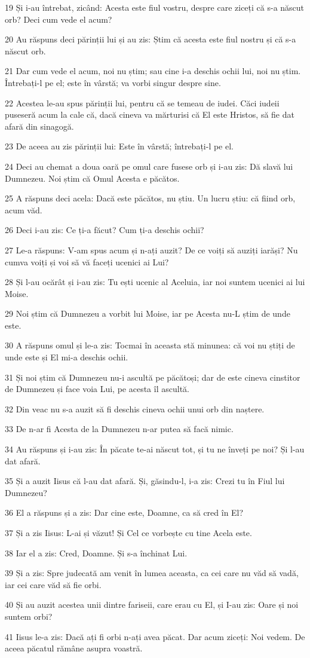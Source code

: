 \par 19 Și i-au întrebat, zicând: Acesta este fiul vostru, despre care ziceți că s-a născut orb? Deci cum vede el acum?
\par 20 Au răspuns deci părinții lui și au zis: Știm că acesta este fiul nostru și că s-a născut orb.
\par 21 Dar cum vede el acum, noi nu știm; sau cine i-a deschis ochii lui, noi nu știm. Întrebați-l pe el; este în vârstă; va vorbi singur despre sine.
\par 22 Acestea le-au spus părinții lui, pentru că se temeau de iudei. Căci iudeii puseseră acum la cale că, dacă cineva va mărturisi că El este Hristos, să fie dat afară din sinagogă.
\par 23 De aceea au zis părinții lui: Este în vârstă; întrebați-l pe el.
\par 24 Deci au chemat a doua oară pe omul care fusese orb și i-au zis: Dă slavă lui Dumnezeu. Noi știm că Omul Acesta e păcătos.
\par 25 A răspuns deci acela: Dacă este păcătos, nu știu. Un lucru știu: că fiind orb, acum văd.
\par 26 Deci i-au zis: Ce ți-a făcut? Cum ți-a deschis ochii?
\par 27 Le-a răspuns: V-am spus acum și n-ați auzit? De ce voiți să auziți iarăși? Nu cumva voiți și voi să vă faceți ucenici ai Lui?
\par 28 Și l-au ocărât și i-au zis: Tu ești ucenic al Aceluia, iar noi suntem ucenici ai lui Moise.
\par 29 Noi știm că Dumnezeu a vorbit lui Moise, iar pe Acesta nu-L știm de unde este.
\par 30 A răspuns omul și le-a zis: Tocmai în aceasta stă minunea: că voi nu știți de unde este și El mi-a deschis ochii.
\par 31 Și noi știm că Dumnezeu nu-i ascultă pe păcătoși; dar de este cineva cinstitor de Dumnezeu și face voia Lui, pe acesta îl ascultă.
\par 32 Din veac nu s-a auzit să fi deschis cineva ochii unui orb din naștere.
\par 33 De n-ar fi Acesta de la Dumnezeu n-ar putea să facă nimic.
\par 34 Au răspuns și i-au zis: În păcate te-ai născut tot, și tu ne înveți pe noi? Și l-au dat afară.
\par 35 Și a auzit Iisus că l-au dat afară. Și, găsindu-l, i-a zis: Crezi tu în Fiul lui Dumnezeu?
\par 36 El a răspuns și a zis: Dar cine este, Doamne, ca să cred în El?
\par 37 Și a zis Iisus: L-ai și văzut! Și Cel ce vorbește cu tine Acela este.
\par 38 Iar el a zis: Cred, Doamne. Și s-a închinat Lui.
\par 39 Și a zis: Spre judecată am venit în lumea aceasta, ca cei care nu văd să vadă, iar cei care văd să fie orbi.
\par 40 Și au auzit acestea unii dintre fariseii, care erau cu El, și I-au zis: Oare și noi suntem orbi?
\par 41 Iisus le-a zis: Dacă ați fi orbi n-ați avea păcat. Dar acum ziceți: Noi vedem. De aceea păcatul rămâne asupra voastră.

